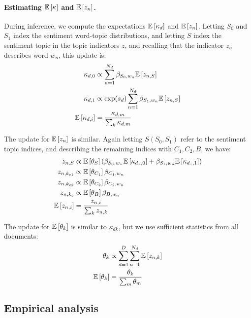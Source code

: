 \paragraph{Estimating $\mathbb{E}\left[\kappa\right]$ and $\mathbb{E}\left[z_n\right]$.}
During inference, we compute the expectations $\mathbb{E}\left[\kappa_d\right]$ and $\mathbb{E}\left[z_n\right]$.  Letting $S_0$ and $S_1$ index the sentiment word-topic distributions, and letting $S$ index the sentiment topic in the topic indicators $z$, and recalling that the indicator $z_n$ describes word $w_n$, this update is:
\begin{align}
  \kappa_{d,0} & \propto \sum_{n=1}^{N_d} \beta_{S_0,w_n} \mathbb{E}\left[z_{n,S}\right] \nonumber \\
  \kappa_{d,1} & \propto \exp(s_d) \sum_{n=1}^{N_d} \beta_{S_1,w_n} \mathbb{E}\left[z_{n,S}\right] \nonumber \\
  \mathbb{E}\left[\kappa_{d,i}\right] & = \frac{\kappa_{d,m}} { \sum_k \kappa_{d,m} } \nonumber \\
\end{align}

The update for $\mathbb{E}\left[z_{n}\right]$ is similar.  Again letting $S (S_0, S_1)$ refer to the sentiment topic indices, and describing the remaining indices with $C_1, C_2, B$, we have:
\begin{align}
  z_{n,S} & \propto \mathbb{E}\left[\theta_{S}\right] \left( \beta_{S_0,w_n} \mathbb{E}\left[\kappa_{d_z, 0}\right] + \beta_{S_1,w_n} \mathbb{E}\left[\kappa_{d_z, 1}\right] \right) \nonumber \\
  z_{n,k_{c1}} & \propto \mathbb{E}\left[\theta_{C_1}\right] \beta_{C_1,w_n}  \nonumber \\
  z_{n,k_{c2}} & \propto \mathbb{E}\left[\theta_{C_2}\right] \beta_{C_2,w_n} \nonumber \\
  z_{n,k_{b}} & \propto \mathbb{E}\left[\theta_{B}\right] \beta_{B,w_n} \nonumber \\
  \mathbb{E}\left[z_{n,i}\right] & = \frac{ z_{n,i}} { \sum_k z_{n,k} } \label{equation:fr_e_z}
\end{align}

The update for $\mathbb{E}\left[\theta_k\right]$ is similar to $\kappa_{dk}$, but we use sufficient statistics from all documents:
\begin{align}
  \theta_{k} & \propto \sum_{d=1}^D \sum_{n=1}^{N_d} \mathbb{E}\left[z_{n,k}\right] \nonumber \\
  \mathbb{E}\left[\theta_{k}\right] & = \frac{\theta_{k}} { \sum_m \theta_{m} } \nonumber \\
\end{align}

\subsection*{Empirical analysis}

